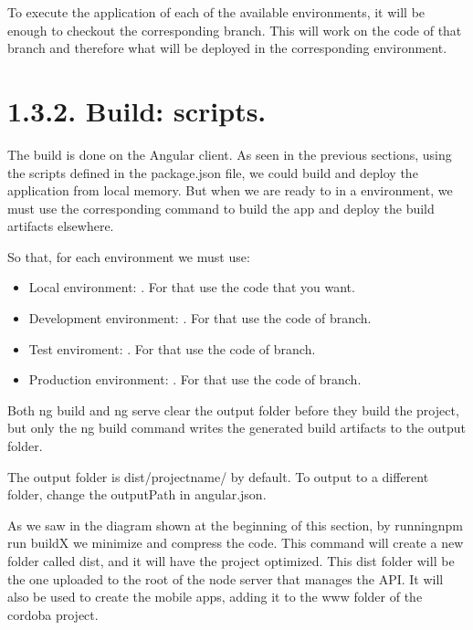 \documentclass[letterpaper,10pt,english]{sphinxmanual}
\begin{document}
To execute the application of each of the available environments, it will be enough to checkout the corresponding branch. This will work on the code of that branch and therefore what will be deployed in the corresponding environment.


\section{1.3.2. Build: scripts.}
\label{\detokenize{pages/Environments/Build_deploy:build-scripts}}
The build is done on the Angular client. As seen in the previous sections, using the scripts defined in the package.json file, we could build and deploy the application from local memory. But when we are ready to  in a environment, we must use the  corresponding command to build the app and deploy the build artifacts elsewhere.

So that, for each environment we must use:
\begin{itemize}
\item {} 
Local environment: . For that use the code that you want.

\item {} 
Development environment: . For that use the code of  branch.

\item {} 
Test enviroment: . For that use the code of  branch.

\item {} 
Production environment: . For that use the code of  branch.

\end{itemize}

Both ng build and ng serve clear the output folder before they build the project, but only the ng build command writes the generated build artifacts to the output folder.

The output folder is dist/project\sphinxhyphen{}name/ by default. To output to a different folder, change the outputPath in angular.json.

As we saw in the diagram shown at the beginning of this section, by runningnpm run buildX we minimize and compress the code. This command will create a new folder called dist, and it will have the project optimized. This dist folder will be the one uploaded to the root of the node server that manages the API. It will also be used to create the mobile apps, adding it to the www folder of the cordoba project.
\end{document}
